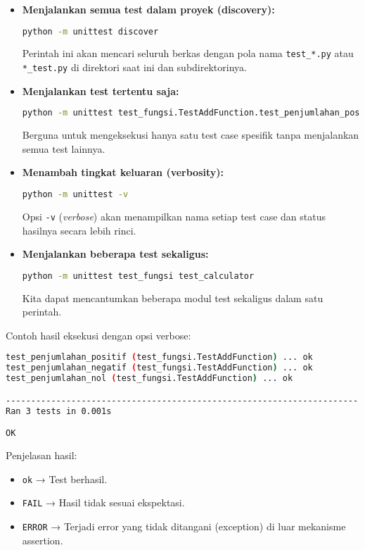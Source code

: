 \begin{itemize}
    \item \textbf{Menjalankan semua test dalam proyek (discovery):}
    \begin{lstlisting}[language=bash]
    python -m unittest discover
    \end{lstlisting}
    Perintah ini akan mencari seluruh berkas dengan pola nama \texttt{test\_*.py} atau \texttt{*\_test.py} di direktori saat ini dan subdirektorinya.

    \item \textbf{Menjalankan test tertentu saja:}
    \begin{lstlisting}[language=bash]
    python -m unittest test_fungsi.TestAddFunction.test_penjumlahan_positif
    \end{lstlisting}
    Berguna untuk mengeksekusi hanya satu test case spesifik tanpa menjalankan semua test lainnya.

    \item \textbf{Menambah tingkat keluaran (verbosity):}
    \begin{lstlisting}[language=bash]
    python -m unittest -v
    \end{lstlisting}
    Opsi \texttt{-v} (\emph{verbose}) akan menampilkan nama setiap test case dan status hasilnya secara lebih rinci.

    \item \textbf{Menjalankan beberapa test sekaligus:}
    \begin{lstlisting}[language=bash]
    python -m unittest test_fungsi test_calculator
    \end{lstlisting}
    Kita dapat mencantumkan beberapa modul test sekaligus dalam satu perintah.
\end{itemize}

Contoh hasil eksekusi dengan opsi verbose:

\begin{lstlisting}[language=bash]
test_penjumlahan_positif (test_fungsi.TestAddFunction) ... ok
test_penjumlahan_negatif (test_fungsi.TestAddFunction) ... ok
test_penjumlahan_nol (test_fungsi.TestAddFunction) ... ok

----------------------------------------------------------------------
Ran 3 tests in 0.001s

OK
\end{lstlisting}

Penjelasan hasil:
\begin{itemize}
    \item \texttt{ok} → Test berhasil.
    \item \texttt{FAIL} → Hasil tidak sesuai ekspektasi.
    \item \texttt{ERROR} → Terjadi error yang tidak ditangani (exception) di luar mekanisme assertion.
\end{itemize}


